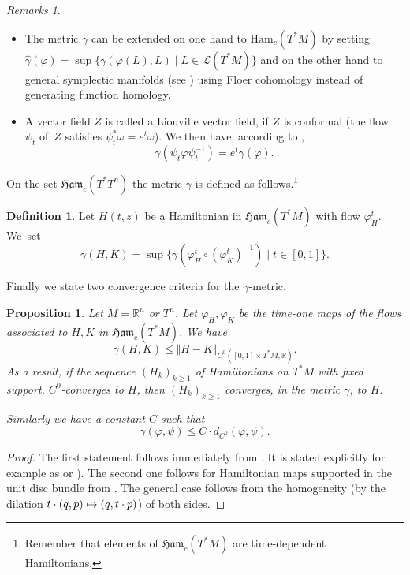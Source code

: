 \documentclass[JEP,XML,SOM,NoFloatCountersInSection,Unicode,published]{cedram}
\newcommand\mto{\mathchoice{\longmapsto}{\mapsto}{\mapsto}{\mapsto}}
\numberwithin{equation}{section}
\newcommand {\Ham}{{\mathfrak {Ham}}}
\newcommand {\DHam}{\mathrm{Ham}}
\theoremstyle{plain}
\newtheorem{proposition}[theorem]{Proposition}
\theoremstyle{definition}
\newtheorem{definition}[theorem]{Definition}
\theoremstyle{remark}
\newtheorem{remarks}[theorem]{Remarks}
\begin{document}
\skpt
\begin{remarks}
\begin{itemize}
\item The metric $\gamma$ can be extended on one hand to $\DHam_c(T^*M)$ by setting $\widehat \gamma (\varphi)=\sup \{ \gamma (\varphi(L),L) \mid L\in {\mathcal L} (T^*M)\}$ and on the other hand to general symplectic manifolds (see \cite{Oh-spectrum1, Schwarz}) using Floer cohomology instead of generating function homology.
\item A vector field $Z$ is called a Liouville vector field, if
$Z$ is conformal (\ie the flow~$\psi_{t}$ of~$Z$
satisfies $\psi_{t}^{*} \omega = e^{t}\omega$). We then have, according to \cite[Cor.\,4.3, p.\,698]{Viterbo-STAGGF},
\begin{equation} \label{conf}
\gamma (\psi_{t}\varphi \psi^{-1}_{t}) = e^{t} \gamma (\varphi).
\end{equation}
\end{itemize}
\end{remarks}

On the set $\Ham_{c}(T^*T^n)$ the metric $ \gamma$ is defined as follows.\footnote{Remember that elements of $\Ham_{c}(T^*M)$ are time-dependent Hamiltonians.}

\begin{definition}
Let $H(t,z)$ be a Hamiltonian in $\Ham_{c}(T^*M)$ with flow $\varphi_{H}^t$. We~set
\[
\gamma (H,K)=\sup \bigl\{\gamma (\varphi_{H}^t \circ(\varphi_{K}^t)^{-1}) \mid t \in [0,1] \bigr\}.
\]
\end{definition}
Finally we state two convergence criteria for the
$\gamma$-metric.

\begin{proposition}\label{Prop-3.12}
Let $M = \mathbb{R}^{n}$ or $T^{n}$.
Let $\varphi_{H}, \varphi_{K}$ be the time-one maps of the flows associated to $H,K$ in $\Ham_{c}(T^*M)$. We have
\[
\gamma (H,K) \leq \Vert H-K \Vert _{C^0([0,1]\times T^{*}M, {\mathbb R})}.
\]
As a result, if the sequence $(H_{k})_{k\geq 1}$ of Hamiltonians on $T^{*}M$ with fixed
support, $C^{0}$-converges to $H$, then $(H_{k})_{k\geq 1}$ converges, in the
metric $\gamma$, to $H$.

Similarly we have a constant $C$ such that
\[
\gamma (\varphi, \psi) \leq C\cdot d_{C^0}(\varphi, \psi).
\]
\end{proposition}

\begin{proof} The first statement follows immediately from \cite[Prop.\,4.6, p.\,699 \& Prop.\,4.14, p.\,707]{Viterbo-STAGGF}. It is stated explicitly for example as \cite[Prop.\,2.15]{Viterbo-Montreal} or
\cite[Prop.\,2.4(d), p.\,378]{Humiliere}).
The second one follows for Hamiltonian maps supported in the unit disc bundle from \cite[Th.\,5]{Seyfaddini}. The general case follows from the homogeneity (by the dilation $t\cdot (q,p)\mto (q,t\cdot p)$) of both sides.
\end{proof}
\end{document}
